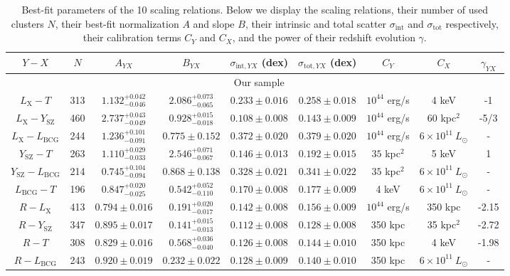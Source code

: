 \documentclass{aa}   %
\newcommand{\LT}{$L_{\text{X}}-T$}
\newcommand{\YT}{$Y_{\text{SZ}}-T$}
\newcommand{\LbcgT}{$L_{\text{BCG}}-T$}
\newcommand{\LY}{$L_{\text{X}}-Y_{\text{SZ}}$}
\newcommand{\LxLbcg}{$L_{\text{X}}-L_{\text{BCG}}$}
\newcommand{\YLbcg}{$Y_{\text{SZ}}-L_{\text{BCG}}$}
\newcommand{\RL}{$R-L_{\text{X}}$}
\newcommand{\RY}{$R-Y_{\text{SZ}}$}
\newcommand{\RLbcg}{$R-L_{\text{BCG}}$}
\newcommand{\RT}{$R-T$}
\begin{document}
\begin{table}[hbtp]
\caption{\small{Best-fit parameters of the 10 scaling relations. Below we display the scaling relations, their number of used clusters $N$, their best-fit normalization $A$ and slope $B$, their intrinsic and total scatter $\sigma_{\text{int}}$ and $\sigma_{\text{tot}}$ respectively, their calibration terms $C_Y$ and $C_X$, and the power of their redshift evolution $\gamma$.}}
\label{best-fit}
\begin{center}
\renewcommand{\arraystretch}{1.3}
\small
\begin{tabular}{ c  c  c  c  c  c | c  c c}
\hline \hline


$Y-X$ & $N$ & $A_{YX}$ & $B_{YX}$ & $\sigma_{\text{int},YX}$ (dex) & $\sigma_{\text{tot},YX}$ (dex) & $C_Y$ & $C_X$ & $\gamma_{YX}$ \\
\hline \hline
 & & & & Our sample & & & & \\ \hline
\LT & 313 & $1.132^{+0.042}_{-0.046}$ & $2.086^{+0.073}_{-0.065}$ & $0.233\pm 0.016$ & $0.258\pm 0.018$ & $10^{44}$ erg/s & 4 keV & -1 \\ 
\LY & 460 & $2.737^{+0.043}_{-0.049}$ & $0.928^{+0.015}_{-0.018}$ & $0.108\pm 0.008$ & $0.143\pm 0.009$ & $10^{44}$ erg/s & 60 kpc$^2$ & -5/3 \\ 
\LxLbcg & 244 & $1.236^{+0.101}_{-0.091}$ & $0.775\pm 0.152$ & $0.372\pm 0.020$ & $0.379\pm 0.020$ & $10^{44}$ erg/s & $6\times 10^{11}\ L_{\odot}$ & - \\ 
\YT & 263 & $1.110^{+0.029}_{-0.033}$ & $2.546^{+0.071}_{-0.067}$ & $0.146\pm 0.013$ & $0.192\pm 0.015$ & $35$ kpc$^2$& 5 keV & 1\\ 
\YLbcg & 214 & $0.745^{+0.104}_{-0.094}$ & $0.868\pm 0.138$ & $0.328\pm 0.021$ & $0.341\pm 0.022$ & $35$ kpc$^2$ & $6\times 10^{11}\ L_{\odot}$ & - \\ 
\LbcgT & 196 & $0.847^{+0.020}_{-0.025}$ & $0.542^{+0.052}_{-0.110}$ & $0.170\pm0.008$ & $0.177\pm 0.009$  &4 keV & $6\times 10^{11}\ L_{\odot}$& - \\ 
\RL &  413 & $0.794\pm 0.016$ & $0.191^{+0.020}_{-0.017}$ & $0.142\pm 0.008$ & $0.156\pm 0.009$ & $10^{44}$ erg/s & 350 kpc & -2.15 \\ 
\RY & 347 & $0.895\pm 0.017$ & $0.141^{+0.015}_{-0.013}$ & $0.112\pm 0.008$ & $0.128\pm 0.008$ & 350 kpc & 35 kpc$^2$ & -2.72 \\ 
\RT &  308 & $0.829\pm 0.016$ & $0.568^{+0.036}_{-0.040}$ & $0.126\pm 0.008$ & $0.144\pm 0.010$ & 350 kpc & 4 keV & -1.98 \\ 
\RLbcg & 243 & $0.920\pm 0.019$ &  $0.232\pm 0.022$ & $0.128\pm 0.009$ & $0.140\pm 0.010$ & 350 kpc & $6\times 10^{11}\ L_{\odot}$ & -  \\ \hline

\end{tabular}
\end{center}
\end{table}
\end{document}

